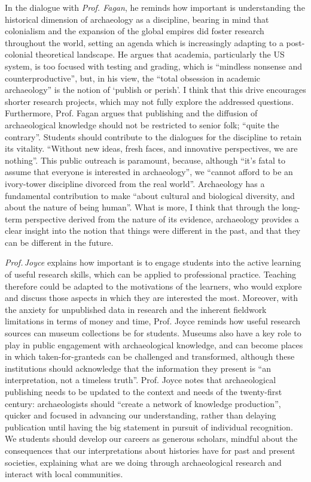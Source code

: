 		 In the dialogue with \emph{Prof. Fagan}, he reminds how important is understanding the historical dimension of archaeology as a discipline, bearing in mind that colonialism and the expansion of the global empires did foster research throughout the world, setting an agenda which is increasingly adapting to a post-colonial theoretical landscape. He argues that academia, particularly the US system, is too focused with testing and grading, which is “mindless nonsense and counterproductive”, but, in his view, the “total obsession in academic archaeology” is the notion of ‘publish or perish’. I think that this drive encourages shorter research projects, which may not fully explore the addressed questions. Furthermore, Prof. Fagan argues that publishing and the diffusion of archaeological knowledge should not be restricted to senior folk; “quite the contrary”. Students should contribute to the dialogues for the discipline to retain its vitality. “Without new ideas, fresh faces, and innovative perspectives, we are nothing”. This public outreach is paramount, because, although “it’s fatal to assume that everyone is interested in archaeology”, we “cannot afford to be an ivory-tower discipline divorced from the real world”. Archaeology has a fundamental contribution to make “about cultural and biological diversity, and about the nature of being human”. What is more, I think that through the long-term perspective derived from the nature of its evidence, archaeology provides a clear insight into the notion that things were different in the past, and that they can be different in the future. 
		 
		 \emph{Prof.\,Joyce} explains how important is to engage students into the active learning of useful research skills, which can be applied to professional practice. Teaching therefore could be adapted to the motivations of the learners, who would explore and discuss those aspects in which they are interested the most. Moreover, with the anxiety for unpublished data in research and the inherent fieldwork limitations in terms of money and time, Prof. Joyce reminds how useful research sources can museum collections be for students. Museums also have a key role to play in public engagement with archaeological knowledge, and can become places in which taken-for-granteds can be challenged and transformed, although these institutions should acknowledge that the information they present is “an interpretation, not a timeless truth”. Prof. Joyce notes that archaeological publishing needs to be updated to the context and needs of the twenty-first century: archaeologists should “create a network of knowledge production”, quicker and focused in advancing our understanding, rather than delaying publication until having the big statement in pursuit of individual recognition. We students should develop our careers as generous scholars, mindful about the consequences that our interpretations about histories have for past and present societies, explaining what are we doing through archaeological research and interact with local communities.
		 
